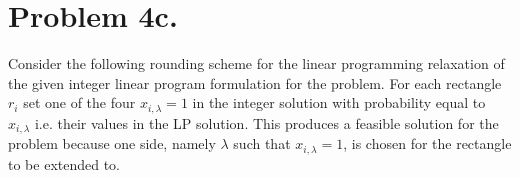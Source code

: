 \documentclass[12pt]{article}
\begin{document}
\section*{Problem 4c.}
Consider the following rounding scheme for the linear programming relaxation of
the given integer linear program formulation for the problem. For each
rectangle $r_i$ set one of the four $x_{i,\lambda} = 1$ in the integer solution
with probability equal to $x_{i,\lambda}$ i.e. their values in the LP solution.
This produces a feasible solution for the problem because one side, namely
$\lambda$ such that $x_{i,\lambda} = 1$, is chosen for the rectangle to be
extended to.
\end{document}

